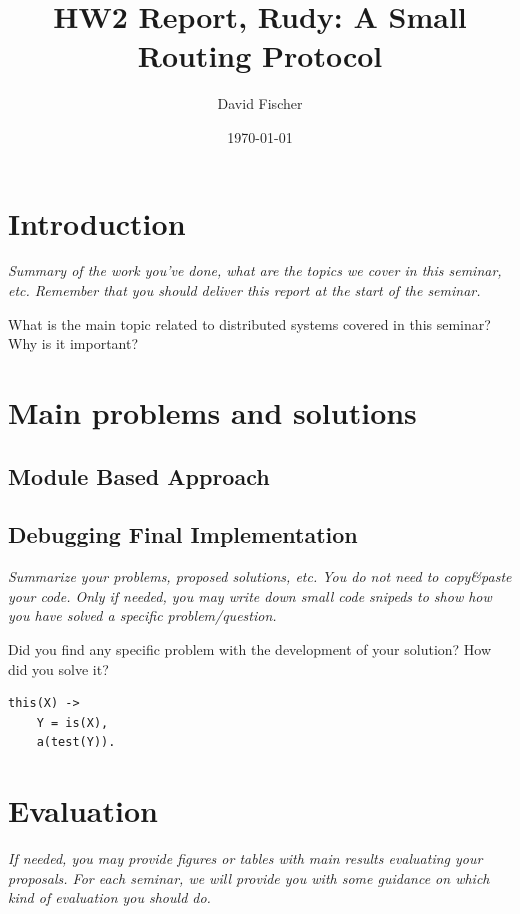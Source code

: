 \documentclass[a4paper, 11pt]{article}
\title{HW2 Report, Rudy: A Small Routing Protocol}
\author{David Fischer}
\date{\today{}}
\begin{document}
\maketitle

\section{Introduction}

\textit{Summary of the work you've done, what are the topics we cover
  in this seminar, etc. Remember that you should deliver this report
  at the start of the seminar.}

What is the main topic related to distributed systems covered in this seminar?
Why is it important?

\section{Main problems and solutions}

\subsection{Module Based Approach}

\subsection{Debugging Final Implementation}

\textit{Summarize your problems, proposed solutions, etc. You do not
  need to copy\&paste your code. Only if needed, you may write down
  small code snipeds to show how you have solved a specific
  problem/question.}

Did you find any specific problem with the development of your
solution?  How did you solve it?

\begin{verbatim}
this(X) ->
    Y = is(X),
    a(test(Y)).
\end{verbatim}

\section{Evaluation}

\textit{If needed, you may provide figures or tables with main results
  evaluating your proposals. For each seminar, we will provide you
  with some guidance on which kind of evaluation you should do.}
\end{document}

